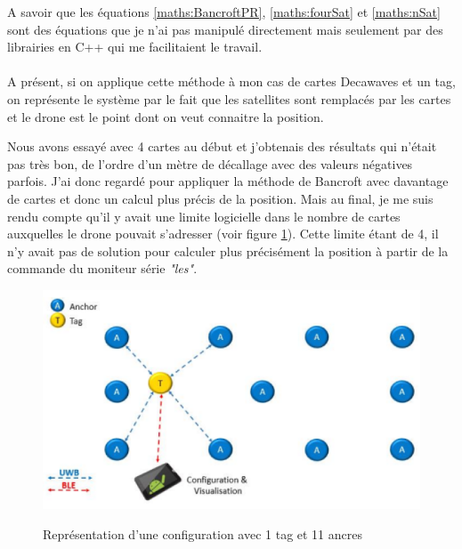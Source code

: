             A savoir que les équations \ref{maths:BancroftPR}, \ref{maths:fourSat} et \ref{maths:nSat} sont des équations que je n'ai pas manipulé directement mais seulement par des librairies en C++ qui me facilitaient le travail.
            
            
            \paragraph*{}
            A présent, si on applique cette méthode à mon cas de cartes Decawaves et un tag, on représente le système par le fait que les satellites sont remplacés par les cartes et le drone est le point dont on veut connaitre la position.
            
            Nous avons essayé avec 4 cartes au début et j'obtenais des résultats qui n'était pas très bon, de l'ordre d'un mètre de décallage avec des valeurs négatives parfois. J'ai donc regardé pour appliquer la méthode de Bancroft avec davantage de cartes et donc un calcul plus précis de la position. Mais au final, je me suis rendu compte qu'il y avait une limite logicielle dans le nombre de cartes auxquelles le drone pouvait s'adresser (voir figure \ref{fig:decawave4ancres}). Cette limite étant de 4, il n'y avait pas de solution pour calculer plus précisément la position à partir de la commande du moniteur série \textit{"les"}.
            
            \begin{figure}[H]
                \centering
            	\begin{frame}{\includegraphics[width=1\textwidth]{image/decawave4ancres.png}}
            	\end{frame}
            	\caption{\label{fig:decawave4ancres}Représentation d'une configuration avec 1 tag et 11 ancres}
            \end{figure}
            
